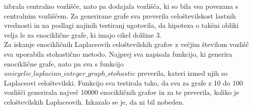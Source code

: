 \documentclass{article}
\begin{document}
izbrala centralno vozlišče, nato pa dodajala vozlišča, ki so bila vsa povezana s centralnim vozliščem. Za generirane grafe sva preverila celoštevilskost lastnih vrednosti in 
na podlagi najinih testiranj ugotovila, da hipoteza o takšni obliki velja le za enociklične grafe, ki imajo cikel dolžine 3. \\
Za iskanje enocikličnih Laplaceovih celoštevilskih grafov z večjim številom vozlišč sva uporabila stohastično metodo. Najprej sva napisala funkcijo,
ki generira enociklične grafe, nato pa sva s funkcijo $unicyclic\_laplacian\_integer\_graph\_stohastic$ preverila, kateri izmed njih so Laplaceovi celoštevilski. 
Funkcijo sva testirala tako, da sva za grafe z 10 do 100 vozlišči generirala največ 10000 enocikličnih grafov in za te preverila, koliko je celoštevilskih Laplaceovih.
Izkazalo se je, da ni bil nobeden.
\end{document}
